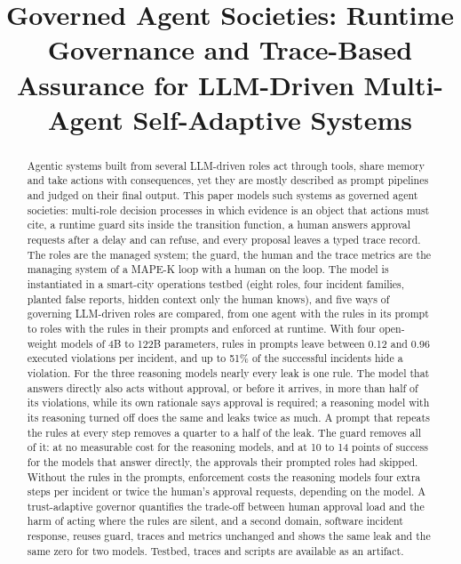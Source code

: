 \documentclass[10pt,conference]{IEEEtran}
\begin{document}
\title{Governed Agent Societies: Runtime Governance and Trace-Based Assurance for LLM-Driven Multi-Agent Self-Adaptive Systems}
\author{}
\maketitle

\begin{abstract}
Agentic systems built from several LLM-driven roles act through tools, share memory and take actions with consequences, yet they are mostly described as prompt pipelines and judged on their final output. This paper models such systems as governed agent societies: multi-role decision processes in which evidence is an object that actions must cite, a runtime guard sits inside the transition function, a human answers approval requests after a delay and can refuse, and every proposal leaves a typed trace record. The roles are the managed system; the guard, the human and the trace metrics are the managing system of a MAPE-K loop with a human on the loop. The model is instantiated in a smart-city operations testbed (eight roles, four incident families, planted false reports, hidden context only the human knows), and five ways of governing LLM-driven roles are compared, from one agent with the rules in its prompt to roles with the rules in their prompts and enforced at runtime. With four open-weight models of 4B to 122B parameters, rules in prompts leave between 0.12 and 0.96 executed violations per incident, and up to 51\% of the successful incidents hide a violation. For the three reasoning models nearly every leak is one rule. The model that answers directly also acts without approval, or before it arrives, in more than half of its violations, while its own rationale says approval is required; a reasoning model with its reasoning turned off does the same and leaks twice as much. A prompt that repeats the rules at every step removes a quarter to a half of the leak. The guard removes all of it: at no measurable cost for the reasoning models, and at 10 to 14 points of success for the models that answer directly, the approvals their prompted roles had skipped. Without the rules in the prompts, enforcement costs the reasoning models four extra steps per incident or twice the human's approval requests, depending on the model. A trust-adaptive governor quantifies the trade-off between human approval load and the harm of acting where the rules are silent, and a second domain, software incident response, reuses guard, traces and metrics unchanged and shows the same leak and the same zero for two models. Testbed, traces and scripts are available as an artifact.
\end{abstract}
\end{document}
